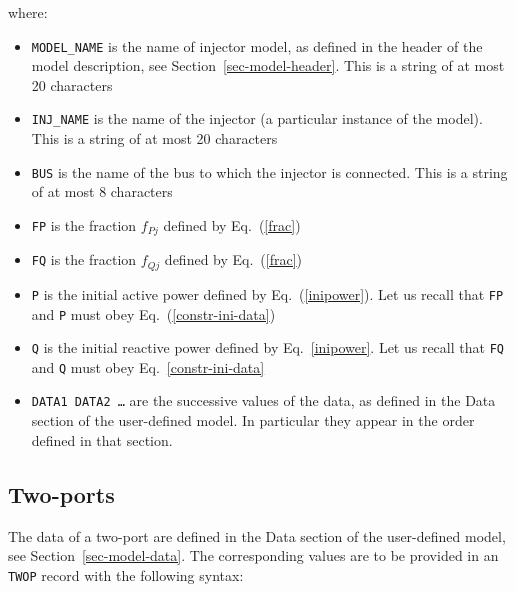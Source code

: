 where:
\begin{itemize}
\item{\tt MODEL\_NAME} is the name of injector model, as defined in the header of the model description, see Section~\ref{sec-model-header}. This is a string of at most 20 characters
\item{\tt INJ\_NAME} is the name of the injector (a particular instance of the model). This is a string of at most 20 characters
\item{\tt BUS} is the name of the bus to which the injector is connected. This is a string of at most 8 characters
\item{\tt FP} is the fraction $f_{Pj}$ defined by Eq.~(\ref{frac})
\item{\tt FQ} is the fraction $f_{Qj}$ defined by Eq.~(\ref{frac})
\item{\tt P} is the initial active power defined by Eq.~(\ref{inipower}). Let us recall that {\tt FP} and {\tt P} must obey Eq.~(\ref{constr-ini-data})
\item{\tt Q} is the initial reactive power defined by Eq.~\ref{inipower}. Let us recall that {\tt FQ} and {\tt Q} must obey Eq.~\ref{constr-ini-data}
\item{\tt DATA1 DATA2 \ldots} are the successive values of the data, as defined in the Data section of the user-defined model. In particular they appear in the order defined in that section.
\end{itemize}


\subsection{Two-ports}\label{format-twop}

The data of a two-port are defined in the Data section of the user-defined model, see Section~\ref{sec-model-data}. The corresponding values are to be provided in an {\tt TWOP} record with the following syntax:

\hspace*{5ex}{\tt TWOP MODEL\_NAME TWOP\_NAME BUS1 BUS2 IND FP1  FQ1  P1  Q1  FP2  FQ2  P2  Q2  DATA1 DATA2 \ldots ;}

